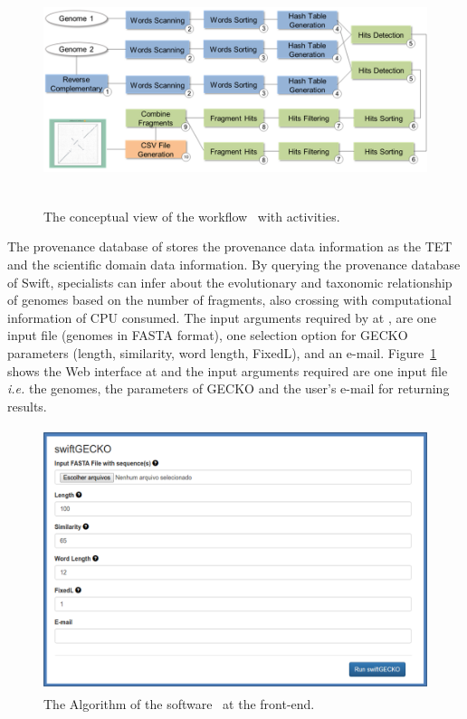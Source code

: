 \begin{figure}[!t]
\begin{center}
	\includegraphics[height=6.7cm]{imgs/swiftgeckoworkflow.png}
	\vspace{-7px}
\caption{The conceptual view of the workflow ~\swift with activities.} \label{fig:swiftgeckoworkflow}
\end{center}
\end{figure}

The provenance database of \swift stores the provenance data information as the TET and the scientific domain data information. By querying the provenance database of Swift, specialists can infer about the evolutionary and taxonomic relationship of genomes based on the number of fragments, also crossing with computational information of CPU consumed. The input arguments required by \swift at \system, are one input file (genomes in FASTA format), one selection option for GECKO parameters (length, similarity, word length, FixedL), and an e-mail.
Figure~\ref{fig:swiftgeckoworkflow} shows the \swift Web interface at \system and the input arguments required are one input file \textit{i.e.} the genomes, the parameters of GECKO and the user's e-mail for returning results.

\begin{figure}[!t]
\begin{center}
	\includegraphics[height=7.7cm]{imgs/swiftgeckoalgorithm.png}
	\vspace{-7px}
\caption{The Algorithm of the software ~\swift at the \system front-end.} \label{fig:swiftgeckoalgorithm}
\end{center}
\end{figure}

